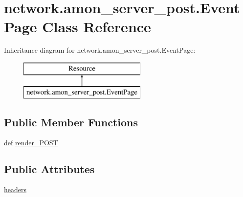 \hypertarget{classnetwork_1_1amon__server__post_1_1_event_page}{\section{network.\-amon\-\_\-server\-\_\-post.\-Event\-Page Class Reference}
\label{classnetwork_1_1amon__server__post_1_1_event_page}
}
Inheritance diagram for network.\-amon\-\_\-server\-\_\-post.\-Event\-Page\-:\begin{figure}[H]
\begin{center}
\leavevmode
\includegraphics[height=2.000000cm]{dc/d77/classnetwork_1_1amon__server__post_1_1_event_page}
\end{center}
\end{figure}
\subsection*{Public Member Functions}
\begin{DoxyCompactItemize}
\item 
def \hyperlink{classnetwork_1_1amon__server__post_1_1_event_page_a739bce4a9714d953318887ba5c7b39d9}{render\-\_\-\-P\-O\-S\-T}
\end{DoxyCompactItemize}
\subsection*{Public Attributes}
\begin{DoxyCompactItemize}
\item 
\hyperlink{classnetwork_1_1amon__server__post_1_1_event_page_a032c0165742082f9d0e347cbdfb50711}{headers}
\end{DoxyCompactItemize}
